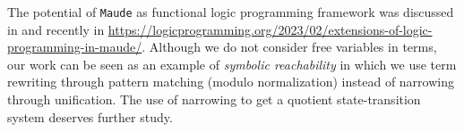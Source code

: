 The potential of \texttt{Maude} as functional logic programming framework was discussed in \cite{Escobar2014} and recently in \url{https://logicprogramming.org/2023/02/extensions-of-logic-programming-in-maude/}. Although we do not consider free variables in terms, our work can be seen as an example of \emph{symbolic reachability} in which we use term rewriting through pattern matching (modulo normalization) instead of narrowing through unification. 
The use of narrowing to get a quotient state-transition system deserves further study.

